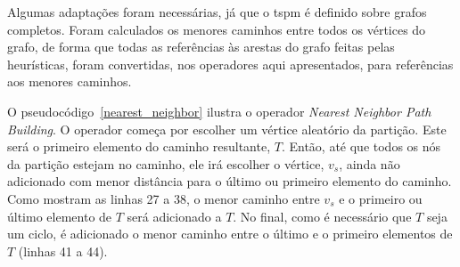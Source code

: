 Algumas adaptações foram necessárias, já que o \ac{tspm} é definido sobre grafos 
completos. Foram calculados os menores caminhos entre todos os vértices do 
grafo, de forma que todas as referências às arestas do grafo feitas pelas 
heurísticas, foram convertidas, nos operadores aqui apresentados, para 
referências aos menores caminhos.

O pseudocódigo~\ref{nearest_neighbor} ilustra o operador 
\textit{Nearest Neighbor Path Building}. O operador começa por escolher um 
vértice aleatório da partição. Este será o primeiro elemento do caminho 
resultante, $T$. Então, até que todos os nós da partição estejam no caminho, ele 
irá escolher o vértice, $v_{s}$, ainda não adicionado com menor distância para o 
último ou primeiro elemento do caminho. Como mostram as linhas 27 a 38, o menor 
caminho entre $v_{s}$ e o primeiro ou último elemento de $T$ será adicionado a 
$T$. No final, como é necessário que $T$ seja um ciclo, é adicionado o menor 
caminho entre o último e o primeiro elementos de $T$ (linhas 41 a 44).

